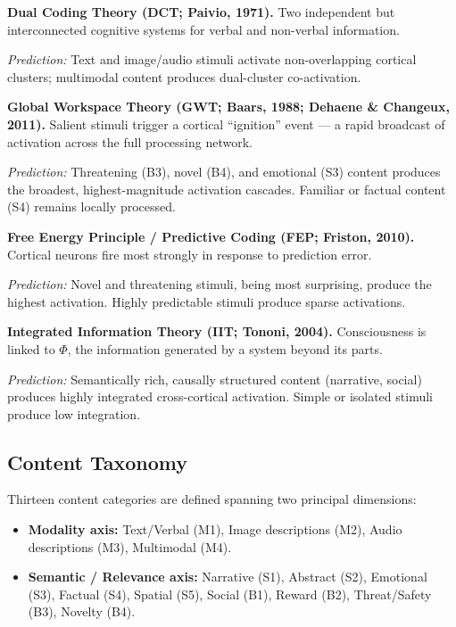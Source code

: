 \documentclass[11pt,letterpaper]{article}
\numberwithin{equation}{section}
\begin{document}
\begin{quotebox}
\textbf{Dual Coding Theory (DCT; Paivio, 1971).} Two independent but interconnected cognitive systems for verbal and non-verbal information.\par
\textit{Prediction:} Text and image/audio stimuli activate non-overlapping cortical clusters; multimodal content produces dual-cluster co-activation.
\end{quotebox}

\begin{quotebox}
\textbf{Global Workspace Theory (GWT; Baars, 1988; Dehaene \& Changeux, 2011).} Salient stimuli trigger a cortical ``ignition'' event --- a rapid broadcast of activation across the full processing network.\par
\textit{Prediction:} Threatening (B3), novel (B4), and emotional (S3) content produces the broadest, highest-magnitude activation cascades. Familiar or factual content (S4) remains locally processed.
\end{quotebox}

\begin{quotebox}
\textbf{Free Energy Principle / Predictive Coding (FEP; Friston, 2010).} Cortical neurons fire most strongly in response to prediction error.\par
\textit{Prediction:} Novel and threatening stimuli, being most surprising, produce the highest activation. Highly predictable stimuli produce sparse activations.
\end{quotebox}

\begin{quotebox}
\textbf{Integrated Information Theory (IIT; Tononi, 2004).} Consciousness is linked to $\Phi$, the information generated by a system beyond its parts.\par
\textit{Prediction:} Semantically rich, causally structured content (narrative, social) produces highly integrated cross-cortical activation. Simple or isolated stimuli produce low integration.
\end{quotebox}

\subsection{Content Taxonomy}

Thirteen content categories are defined spanning two principal dimensions:

\begin{itemize}[leftmargin=1.4em,itemsep=2pt,topsep=2pt]
\item \textbf{Modality axis:} Text/Verbal (M1), Image descriptions (M2), Audio descriptions (M3), Multimodal (M4).
\item \textbf{Semantic / Relevance axis:} Narrative (S1), Abstract (S2), Emotional (S3), Factual (S4), Spatial (S5), Social (B1), Reward (B2), Threat/Safety (B3), Novelty (B4).
\end{itemize}
\end{document}

